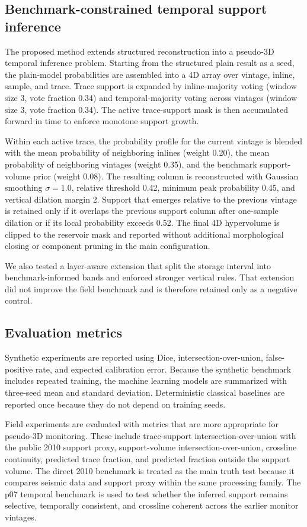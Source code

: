\documentclass[preprint,12pt]{elsarticle}
\begin{document}
\subsection{Benchmark-constrained temporal support inference}

The proposed method extends structured reconstruction into a pseudo-3D temporal inference problem. Starting from the structured plain result as a seed, the plain-model probabilities are assembled into a 4D array over vintage, inline, sample, and trace. Trace support is expanded by inline-majority voting (window size 3, vote fraction 0.34) and temporal-majority voting across vintages (window size 3, vote fraction 0.34). The active trace-support mask is then accumulated forward in time to enforce monotone support growth.

Within each active trace, the probability profile for the current vintage is blended with the mean probability of neighboring inlines (weight 0.20), the mean probability of neighboring vintages (weight 0.35), and the benchmark support-volume prior (weight 0.08). The resulting column is reconstructed with Gaussian smoothing $\sigma=1.0$, relative threshold 0.42, minimum peak probability 0.45, and vertical dilation margin 2. Support that emerges relative to the previous vintage is retained only if it overlaps the previous support column after one-sample dilation or if its local probability exceeds 0.52. The final 4D hypervolume is clipped to the reservoir mask and reported without additional morphological closing or component pruning in the main configuration.

We also tested a layer-aware extension that split the storage interval into benchmark-informed bands and enforced stronger vertical rules. That extension did not improve the field benchmark and is therefore retained only as a negative control.

\subsection{Evaluation metrics}

Synthetic experiments are reported using Dice, intersection-over-union, false-positive rate, and expected calibration error. Because the synthetic benchmark includes repeated training, the machine learning models are summarized with three-seed mean and standard deviation. Deterministic classical baselines are reported once because they do not depend on training seeds.

Field experiments are evaluated with metrics that are more appropriate for pseudo-3D monitoring. These include trace-support intersection-over-union with the public 2010 support proxy, support-volume intersection-over-union, crossline continuity, predicted trace fraction, and predicted fraction outside the support volume. The direct 2010 benchmark is treated as the main truth test because it compares seismic data and support proxy within the same processing family. The p07 temporal benchmark is used to test whether the inferred support remains selective, temporally consistent, and crossline coherent across the earlier monitor vintages.
\end{document}

